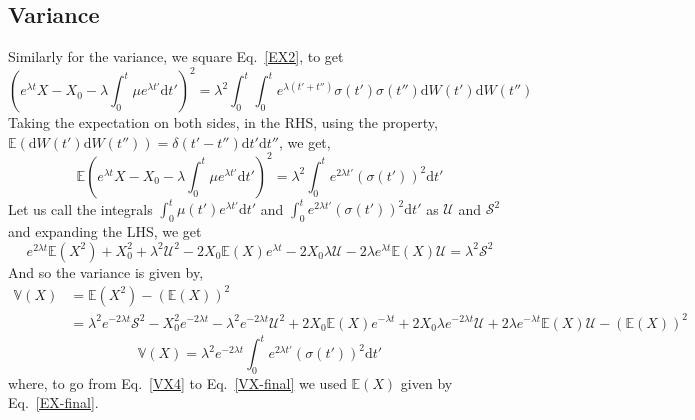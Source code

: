\documentclass[12pt]{iopart}
\begin{document}
\subsection{Variance}
Similarly for the variance, we square Eq.~\eqref{EX2}, to get
\begin{equation}
\label{VX1}
\left(e^{\lambda t}X - X_0 - \lambda\int_0^t \mu e^{\lambda t'}\mathrm{d}t'\right)^2=\lambda^2\int_0^t\int_0^t e^{\lambda(t'+t'')}\sigma(t')\sigma(t'')\mathrm{d}W(t')\mathrm{d}W(t'')
\end{equation}
Taking the expectation on both sides, in the RHS, using the property, $\mathbb{E}(\mathrm{d}W(t')\mathrm{d}W(t'')) = \delta(t'-t'')\mathrm{d}t'\mathrm{d}t''$, we get,
\begin{equation}
\label{VX2}
\mathbb{E}\left(e^{\lambda t}X - X_0 - \lambda\int_0^t \mu e^{\lambda t'}\mathrm{d}t'\right)^2=\lambda^2\int_0^t e^{2\lambda t'}(\sigma(t'))^2\mathrm{d}t'
\end{equation}
Let us call the integrals $\int_0^t\mu(t') e^{\lambda t'}\mathrm{d}t'$ and $\int_0^t e^{2\lambda t'}(\sigma(t'))^2\mathrm{d}t'$ as $\mathcal{U}$ and $\mathcal{S}^2$ and expanding the LHS, we get
\begin{equation}
\label{VX3}
e^{2\lambda t}\mathbb{E}(X^2) + X_0^2 + \lambda^2 \mathcal{U}^2 - 2 X_0 \mathbb{E}(X) e^{\lambda t} - 2 X_0 \lambda\mathcal{U}-2\lambda e^{\lambda t}\mathbb{E}(X)\mathcal{U} = \lambda^2\mathcal{S}^2
\end{equation}
And so the variance is given by,
\begin{align}
\label{VX4}
\mathbb{V}(X) &= \mathbb{E}(X^2)-(\mathbb{E}(X))^2 \nonumber \\
&= \lambda^2 e^{-2\lambda t}\mathcal{S}^2 - X_0^2 e^{-2\lambda t} - \lambda^2 e^{-2\lambda t}\mathcal{U}^2 + 2 X_0 \mathbb{E}(X)e^{-\lambda t} +2 X_0 \lambda e^{-2\lambda t}\mathcal{U}+2\lambda e^{-\lambda t}\mathbb{E}(X)\mathcal{U} - (\mathbb{E}(X))^2
\end{align}
\begin{equation}
\label{VX-final}
\mathbb{V}(X) = \lambda^2 e^{-2\lambda t} \int_0^t e^{2\lambda t'}(\sigma(t'))^2\mathrm{d}t'
\end{equation}
where, to go from Eq.~\eqref{VX4} to Eq.~\eqref{VX-final} we used $\mathbb{E}(X)$ given by Eq.~\eqref{EX-final}.
\end{document}
